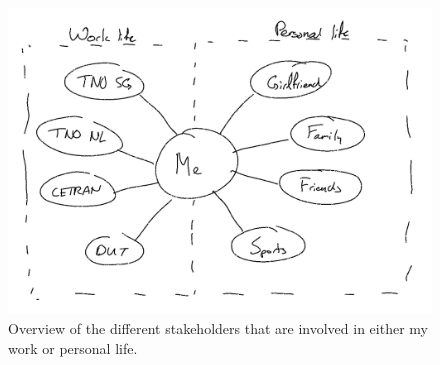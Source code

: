 \begin{figure}[b]
	\centering
	\includegraphics[width=\linewidth]{figures/stakeholders}
	\caption{Overview of the different stakeholders that are involved in either my work or personal life.}
	\label{fig:stakeholders} 
\end{figure}

